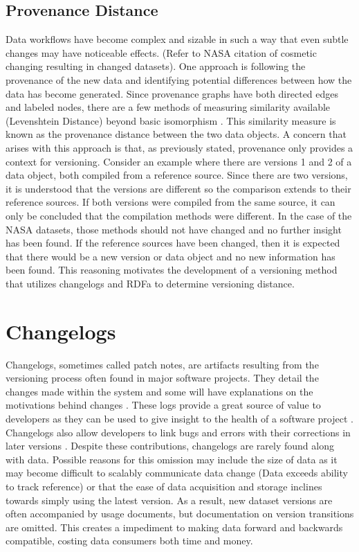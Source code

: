 \subsection{Provenance Distance}

Data workflows have become complex and sizable in such a way that even subtle changes may have noticeable effects.
(Refer to NASA citation of cosmetic changing resulting in changed datasets).
One approach is following the provenance of the new data and identifying potential differences between how the data has become generated.
Since provenance graphs have both directed edges and labeled nodes, there are a few methods of measuring similarity available (Levenshtein Distance) beyond basic isomorphism \cite{proellBigData} \cite{Gao2010} \cite{Goddard:1996:DGU:246962.246972} .
This similarity measure is known as the provenance distance between the two data objects.
A concern that arises with this approach is that, as previously stated, provenance only provides a context for versioning.
Consider an example where there are versions 1 and 2 of a data object, both compiled from a reference source.
Since there are two versions, it is understood that the versions are different so the comparison extends to their reference sources.
If both versions were compiled from the same source, it can only be concluded that the compilation methods were different.
In the case of the NASA datasets, those methods should not have changed and no further insight has been found.
If the reference sources have been changed, then it is expected that there would be a new version or data object and no new information has been found.
This reasoning motivates the development of a versioning method that utilizes changelogs and RDFa to determine versioning distance.

\section{Changelogs}

Changelogs, sometimes called patch notes, are artifacts resulting from the versioning process often found in major software projects.
They detail the changes made within the system and some will have explanations on the motivations behind changes \cite{uel1037}.
These logs provide a great source of value to developers as they can be used to give insight to the health of a software project \cite{German03automatingthe} \cite{6132954}.
Changelogs also allow developers to link bugs and errors with their corrections in later versions \cite{Chen:2004:OCL:990374.990391}.
Despite these contributions, changelogs are rarely found along with data.
Possible reasons for this omission may include the size of data  as it may become difficult to scalably communicate data change (Data exceeds ability to track reference) or that the ease of data acquisition and storage inclines towards simply using the latest version.
As a result, new dataset versions are often accompanied by usage documents, but documentation on version transitions are omitted.
This creates a impediment to making data forward and backwards compatible, costing data consumers both time and money.

